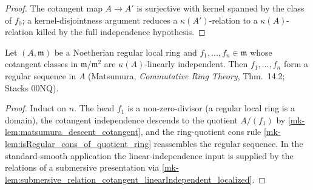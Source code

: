 \begin{proof}
  The cotangent map \(A \to A'\) is surjective with kernel
  spanned by the class of \(f_0\); a kernel-disjointness argument reduces a
  \(\kappa(A')\)-relation to a \(\kappa(A)\)-relation killed by the full independence
  hypothesis.
\end{proof}

\begin{lemma}\label{mk-lem:matsumura_isRegular_of_linearIndependent_cotangent}
  \leanok

  Let \((A, \mathfrak m)\) be a Noetherian regular local ring and \(f_1,\dots,f_n \in
  \mathfrak m\) whose cotangent classes in \(\mathfrak m/\mathfrak m^2\) are
  \(\kappa(A)\)-linearly independent. Then \(f_1,\dots,f_n\) form a regular sequence in
  \(A\) (Matsumura, \emph{Commutative Ring Theory}, Thm.~14.2; Stacks 00NQ).
\end{lemma}

\begin{proof}
  Induct on \(n\). The head \(f_1\) is a non-zero-divisor
  (a regular local ring is a domain), the cotangent independence descends to the
  quotient \(A/(f_1)\) by \ref{mk-lem:matsumura_descent_cotangent}, and the
  ring-quotient cons rule \ref{mk-lem:isRegular_cons_of_quotient_ring} reassembles the
  regular sequence. In the standard-smooth application the linear-independence input is
  supplied by the relations of a submersive presentation via
  \ref{mk-lem:submersive_relation_cotangent_linearIndependent_localized}.
\end{proof}

